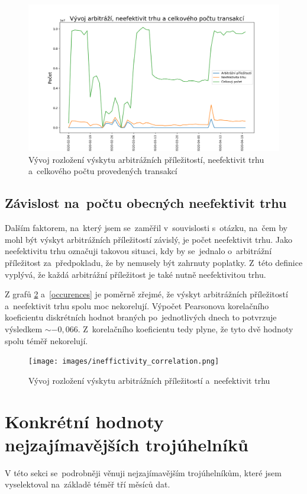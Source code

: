 \documentclass[thesis=B,czech]{FITthesis}[2019/03/21]
\begin{document}
\begin{figure}\centering
	\includegraphics[width=1\textwidth]{images/occurence_correlation.png}
	\caption{Vývoj rozložení výskytu arbitrážních příležitostí, neefektivit trhu a~celkového počtu provedených transakcí}\label{occurence_correlation}
\end{figure}
\subsection{Závislost na~počtu obecných neefektivit trhu}
Dalším faktorem, na~který jsem se~zaměřil v~souvislosti s~otázku, na~čem by mohl být výskyt arbitrážních příležitostí závislý, je počet neefektivit trhu. Jako neefektivitu trhu označuji takovou situaci, kdy by se~jednalo o~arbitrážní příležitost za~předpokladu, že by nemusely být zahrnuty poplatky. Z~této definice vyplývá, že každá arbitrážní příležitost je také nutně neefektivitou trhu.

Z grafů \ref{ineffictivity_correlation} a~\ref{occurences} je poměrně zřejmé, že výskyt arbitrážních příležitostí a~neefektivit trhu spolu moc nekorelují. Výpočet Pearsonova korelačního koeficientu diskrétních hodnot braných po~jednotlivých dnech to potvrzuje výsledkem \(\sim-0,066\). Z~korelačního koeficientu tedy plyne, že tyto dvě hodnoty spolu téměř nekorelují.

\begin{figure}\centering
	\texttt{[image: images/ineffictivity\_correlation.png]}
	\caption{Vývoj rozložení výskytu arbitrážních příležitostí a~neefektivit trhu}\label{ineffictivity_correlation}
\end{figure}
\section{Konkrétní hodnoty nejzajímavějších trojúhelníků}
V této sekci se~podrobněji věnuji nejzajímavějším trojúhelníkům, které jsem vyselektoval na~základě téměř tří měsíců dat. 
\end{document}
